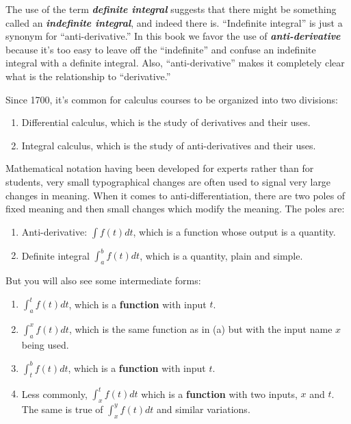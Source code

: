 \documentclass[
  letterpaper,
  DIV=11,
  numbers=noendperiod,
  oneside]{scrreprt}
\providecommand{\tightlist}{%
  \setlength{\itemsep}{0pt}\setlength{\parskip}{0pt}}
\begin{document}
The use of the term \textbf{\emph{definite integral}} suggests that
there might be something called an \textbf{\emph{indefinite integral}},
and indeed there is. ``Indefinite integral'' is just a synonym for
``anti-derivative.'' In this book we favor the use of
\textbf{\emph{anti-derivative}} because it's too easy to leave off the
``indefinite'' and confuse an indefinite integral with a definite
integral. Also, ``anti-derivative'' makes it completely clear what is
the relationship to ``derivative.''

Since 1700, it's common for calculus courses to be organized into two
divisions:

\begin{enumerate}
\def\labelenumi{\roman{enumi}.}
\tightlist
\item
  Differential calculus, which is the study of derivatives and their
  uses.
\item
  Integral calculus, which is the study of anti-derivatives and their
  uses.
\end{enumerate}

Mathematical notation having been developed for experts rather than for
students, very small typographical changes are often used to signal very
large changes in meaning. When it comes to anti-differentiation, there
are two poles of fixed meaning and then small changes which modify the
meaning. The poles are:

\begin{enumerate}
\def\labelenumi{\roman{enumi}.}
\tightlist
\item
  Anti-derivative: \(\int f(t) dt\), which is a function whose output is
  a quantity.
\item
  Definite integral \(\int_a^b f(t) dt\), which is a quantity, plain and
  simple.
\end{enumerate}

But you will also see some intermediate forms:

\begin{enumerate}
\def\labelenumi{\alph{enumi}.}
\item
  \(\int_a^t f(t) dt\), which is a \textbf{function} with input \(t\).
\item
  \(\int_a^x f(t) dt\), which is the same function as in (a) but with
  the input name \(x\) being used.
\item
  \(\int_t^b f(t) dt\), which is a \textbf{function} with input \(t\).
\item
  Less commonly, \(\int_x^t f(t) dt\) which is a \textbf{function} with
  two inputs, \(x\) and \(t\). The same is true of \(\int_x^y f(t) dt\)
  and similar variations.
\end{enumerate}
\end{document}
